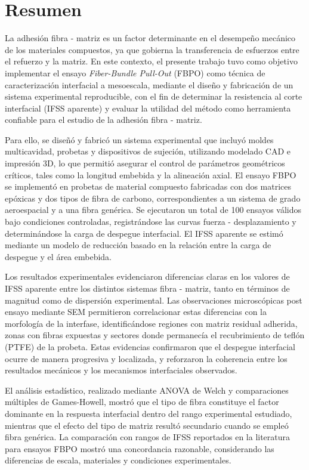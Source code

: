 \section*{Resumen}

La adhesión fibra - matriz es un factor determinante en el desempeño mecánico de los materiales
compuestos, ya que gobierna la transferencia de esfuerzos entre el refuerzo y la matriz. En este
contexto, el presente trabajo tuvo como objetivo implementar el ensayo \textit{Fiber-Bundle Pull-Out}
(FBPO) como técnica de caracterización interfacial a mesoescala, mediante el diseño y fabricación
de un sistema experimental reproducible, con el fin de determinar la resistencia al corte
interfacial (IFSS aparente) y evaluar la utilidad del método como herramienta confiable para el
estudio de la adhesión fibra - matriz.

Para ello, se diseñó y fabricó un sistema experimental que incluyó moldes multicavidad, probetas
y dispositivos de sujeción, utilizando modelado CAD e impresión 3D, lo que permitió asegurar el
control de parámetros geométricos críticos, tales como la longitud embebida y la alineación axial. El
ensayo FBPO se implementó en probetas de material compuesto fabricadas con dos matrices epóxicas
y dos tipos de fibra de carbono, correspondientes a un sistema de grado aeroespacial y a una
fibra genérica. Se ejecutaron un total de 100 ensayos válidos bajo condiciones controladas,
registrándose las curvas fuerza - desplazamiento y determinándose la carga de despegue interfacial.
El IFSS aparente se estimó mediante un modelo de reducción basado en la relación entre la carga de
despegue y el área embebida.

Los resultados experimentales evidenciaron diferencias claras en los valores de IFSS aparente
entre los distintos sistemas fibra - matriz, tanto en términos de magnitud como de dispersión experimental.
Las observaciones microscópicas post ensayo mediante SEM permitieron correlacionar estas diferencias
con la morfología de la interfase, identificándose regiones con matriz residual adherida, zonas
con fibras expuestas y sectores donde permanecía el recubrimiento de teflón (PTFE) de la probeta. Estas
evidencias confirmaron que el despegue interfacial ocurre de manera progresiva y localizada, y
reforzaron la coherencia entre los resultados mecánicos y los mecanismos interfaciales observados.

El análisis estadístico, realizado mediante ANOVA de Welch y comparaciones múltiples de
Games-Howell, mostró que el tipo de fibra constituye el factor dominante en la respuesta
interfacial dentro del rango experimental estudiado, mientras que el efecto del tipo de matriz
resultó secundario cuando se empleó fibra genérica. La comparación con rangos de IFSS reportados
en la literatura para ensayos FBPO mostró una concordancia razonable, considerando las
diferencias de escala, materiales y condiciones experimentales.


